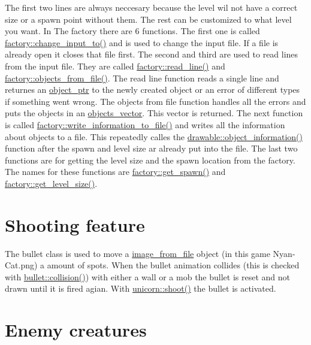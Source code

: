 The first two lines are always neccesary because the level wil not have a correct size or a spawn point without them. The rest can be customized to what level you want. In The factory there are 6 functions. The first one is called \hyperlink{classfactory_a9e164a8fbb65188de99c39d55d7cc384}{factory\+::change\+\_\+input\+\_\+to()} and is used to change the input file. If a file is already open it closes that file first. The second and third are used to read lines from the input file. They are called \hyperlink{classfactory_a82385866bc910c1b3a3e82d56487dd24}{factory\+::read\+\_\+line()} and \hyperlink{classfactory_afb2fad4ac9b0f39b1bfc3f3fc8d218b6}{factory\+::objects\+\_\+from\+\_\+file()}. The read line function reads a single line and returnes an \hyperlink{typedefs_8hpp_aab5add95f06d2ba25dbfed8eb07274fa}{object\+\_\+ptr} to the newly created object or an error of different types if something went wrong. The objects from file function handles all the errors and puts the objects in an \hyperlink{typedefs_8hpp_a6c0fdb1dfd0c34dbbdbb5dcd3c608b07}{objects\+\_\+vector}. This vector is returned. The next function is called \hyperlink{classfactory_af17f2a44d75cf8ccf712384341c2fcde}{factory\+::write\+\_\+information\+\_\+to\+\_\+file()} and writes all the information about objects to a file. This repeatedly calles the \hyperlink{classdrawable_a2ed0f8bb53f33477f7722efa7bb24583}{drawable\+::object\+\_\+information()} function after the spawn and level size ar already put into the file. The last two functions are for getting the level size and the spawn location from the factory. The names for these functions are \hyperlink{classfactory_a3c3a039b8f76a947267dbe659166550b}{factory\+::get\+\_\+spawn()} and \hyperlink{classfactory_af9bb026273b34fc032ca5ac73d457611}{factory\+::get\+\_\+level\+\_\+size()}.\hypertarget{index_bullet}{}\section{Shooting feature}\label{index_bullet}
The bullet class is used to move a \hyperlink{classimage__from__file}{image\+\_\+from\+\_\+file} object (in this game Nyan-\/\+Cat.\+png) a amount of spots. When the bullet animation collides (this is checked with \hyperlink{classbullet_ab7e5c677bbd642df24a2251bb58249b7}{bullet\+::collision()}) with either a wall or a mob the bullet is reset and not drawn until it is fired agian. With \hyperlink{classunicorn_af448a3fa5fc5f09254b50afa151ce42b}{unicorn\+::shoot()} the bullet is activated.\hypertarget{index_mob}{}\section{Enemy creatures}\label{index_mob}
